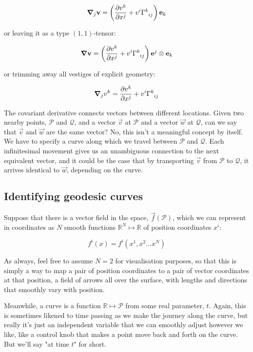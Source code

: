 $$
\grad_j \vec{v}
= \left(
  \frac{\partial v^k}{\partial x^j}
  + v^i \Gamma\indices{^k_i_j} 
\right)
\vec{e}_k
$$

or leaving it as a type $(1, 1)$-tensor:

$$
\grad \vec{v}
= \left(
  \frac{\partial v^k}{\partial x^j}
  + v^i \Gamma\indices{^k_i_j} 
\right)
\vec{e}^j \otimes \vec{e}_k
$$

or trimming away all vestiges of explicit geometry:

$$
\grad_j v^k
= 
\frac{\partial v^k}{\partial x^j}
+ v^i \Gamma\indices{^k_i_j}
$$

The covariant derivative connects vectors between different locations. Given two nearby points, $\mathcal{P}$ and $\mathcal{Q}$, and a vector $\vec{v}$ at $\mathcal{P}$ and a vector $\vec{w}$ at $\mathcal{Q}$, can we say that $\vec{v}$ and $\vec{w}$ are the same vector? No, this isn't a meaningful concept by itself. We have to specify a curve along which we travel between $\mathcal{P}$ and $\mathcal{Q}$. Each infinitesimal movement gives us an unambiguous connection to the next equivalent vector, and it could be the case that by transporting $\vec{v}$ from $\mathcal{P}$ to $\mathcal{Q}$, it arrives identical to $\vec{w}$, depending on the curve.

\subsection{Identifying geodesic curves}

Suppose that there is a vector field in the space, $\vec{f}(\mathcal{P})$, which we can represent in coordinates as $N$ smooth functions $\mathbb{R}^N \mapsto \mathbb{R}$ of position coordinates $x^i$:

$$
f^i(x) = f^i(x^1, x^2 \dots x^N)
$$

As always, feel free to assume $N = 2$ for visualisation purposes, so that this is simply a way to map a pair of position coordinates to a pair of vector coordinates at that position, a field of arrows all over the surface, with lengths and directions that smoothly vary with position.

Meanwhile, a curve is a function $\mathbb{R} \mapsto \mathcal{P}$ from some real parameter, $t$. Again, this is sometimes likened to time passing as we make the journey along the curve, but really it's just an independent variable that we can smoothly adjust however we like, like a control knob that makes a point move back and forth on the curve. But we'll say "at time $t$" for short.

